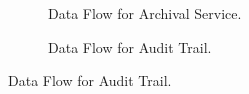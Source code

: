 \documentclass[12pt]{article}
\begin{document}
\begin{figure}
\begin{subfigure}[p]{0.47\textwidth}
\centering	
{}
\caption{Data Flow for Archival Service.}
\end{subfigure}

\begin{subfigure}[p]{0.47\textwidth}
\centering	
{}
\caption{Data Flow for Audit Trail.}
\end{subfigure}


\end{figure}
\end{document}
